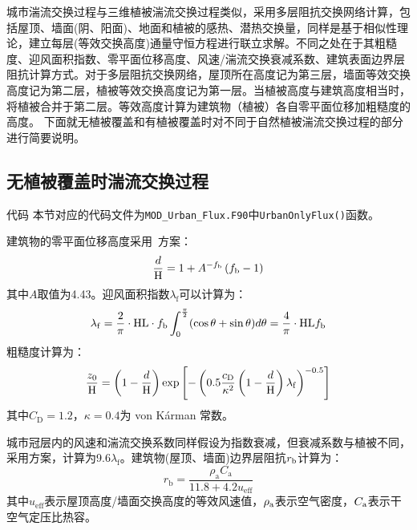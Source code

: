 城市湍流交换过程与三维植被湍流交换过程类似，采用多层阻抗交换网络计算，包括屋顶、墙面(阴、阳面)、地面和植被的感热、潜热交换量，同样是基于相似性理论，建立每层(等效交换高度)通量守恒方程进行联立求解。不同之处在于其粗糙度、迎风面积指数、零平面位移高度、风速/湍流交换衰减系数、建筑表面边界层阻抗计算方式。对于多层阻抗交换网络，屋顶所在高度记为第三层，墙面等效交换高度记为第二层，植被等效交换高度记为第一层。当植被高度与建筑高度相当时，将植被合并于第二层。等效高度计算为建筑物（植被）各自零平面位移加粗糙度的高度。
下面就无植被覆盖和有植被覆盖时对不同于自然植被湍流交换过程的部分进行简要说明。

\subsection{无植被覆盖时湍流交换过程}\label{无植被覆盖时湍流交换过程}
\begin{mymdframed}{代码}
  本节对应的代码文件为\texttt{MOD\_Urban\_Flux.F90}中\texttt{UrbanOnlyFlux()}函数。
\end{mymdframed}

建筑物的零平面位移高度采用~\citet{macdonald1998improved}方案：
\begin{equation}
  \frac{d}{\rm H}=1+A^{-f_{\mathrm{b}}}\left(f_{\mathrm{b}}-1\right)
\end{equation}
其中$A$取值为4.43。迎风面积指数$\lambda_{\mathrm{f}}$可以计算为：
\begin{equation}
  \lambda_{\mathrm{f}}=\frac{2}{\pi} \cdot {\rm HL} \cdot f_{\mathrm{b}} \int_{\mathrm{0}}^{\frac{\pi}{2}}(\cos \theta+\sin \theta) d \theta=\frac{4}{\pi} \cdot {\rm HL} f_{\mathrm{b}}
\end{equation}
粗糙度计算为：
\begin{equation}
  \frac{z_{0}}{\rm H}=\left(1-\frac{d}{\rm H}\right) \exp \left[-\left(0.5 \frac{c_{\mathrm{D}}}{\kappa^{2}}\left(1-\frac{d}{\rm H}\right) \lambda_{\mathrm{f}}\right)^{-0.5}\right]
\end{equation}
其中$C_{\mathrm {D}}=1.2$，$\kappa=0.4$为 von K\'arman 常数。

城市冠层内的风速和湍流交换系数同样假设为指数衰减，但衰减系数与植被不同，
采用\citet{macdonald2000ModellingMeanVelocity}方案，计算为9.6${\lambda_{\mathrm{f}}}$。建筑物(屋顶、墙面)边界层阻抗$r_{\rm b}$计算为\citep{oleson2008urban}：
\begin{equation}
  r_{\mathrm{b}}=\frac{\rho_{\mathrm{a}} C_{\mathrm{a}}}{11.8+4.2 u_{\mathrm{e f f}}}
\end{equation}
其中$u_{\mathrm{eff}}$表示屋顶高度/墙面交换高度的等效风速值，$\rho_{\rm a}$表示空气密度，$C_{\rm a}$表示干空气定压比热容。

